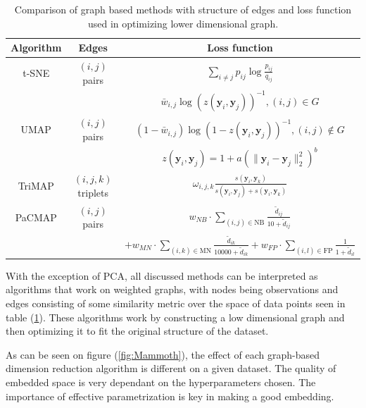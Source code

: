 \begin{table}[htb]
	\begin{center}
		\begin{tabular}{|c|c|c|}
			\hline
			Algorithm & Edges & Loss function \\
			\hline
			t-SNE & $(i, j)$ pairs & $\sum_{i\neq j} p_{ij} \log{\frac{p_{ij}}{q_{ij}}}$ \\
			\hline
			&&
			$\bar{w}_{i,j}\log \left( z(\mathbf{y}_i, \mathbf{y}_j) \right)^{-1}, (i,j) \in G$  \\
			UMAP& $(i, j)$ pairs & $\left(1-\bar{w}_{i,j}\right)\log \left( 1 - z(\mathbf{y}_i, \mathbf{y}_j) \right)^{-1}, (i,j) \notin G$ \\
			&& $z(\mathbf{y}_i, \mathbf{y}_j) = 1+a\left(\|\mathbf{y}_i-\mathbf{y}_j\|_2^{2}\right)^b $ \\
			\hline
			TriMAP & $(i, j, k)$ triplets &
			$\omega_{i,j,k}\frac{s(\mathbf{y}_i,\mathbf{y}_k)}{s(\mathbf{y}_i,\mathbf{y}_j)+s(\mathbf{y}_i,\mathbf{y}_k)}$ \\
			\hline
			PaCMAP & $(i, j)$ pairs &
			$w_{NB}\cdot\sum_{(i,j) \in \textrm{NB}}\frac{\tilde{d}_{ij}}{10 + \tilde{d}_{ij}}$ \\
			&& $+ w_{MN}\cdot\sum_{(i,k) \in \text{MN}}\frac{\tilde{d}_{ik}}{10000 + \tilde{d}_{ik}}+ w_{FP}\cdot\sum_{(i,l) \in \text{FP}}\frac{1}{1 + \tilde{d}_{il}}$ \\
			\hline
		\end{tabular}
		\caption{Comparison of graph based methods with structure of edges and loss function used in optimizing lower dimensional graph.}
		\label{tab:graph}
	\end{center}
\end{table}

With the exception of PCA, all discussed methods can be interpreted as algorithms that work on weighted graphs, with nodes being observations and edges consisting of some similarity metric over the space of data points seen in table (\ref{tab:graph}). These algorithms work by constructing a low dimensional graph and then optimizing it to fit the original structure of the dataset.

As can be seen on figure (\ref{fig:Mammoth}), the effect of each graph-based dimension reduction algorithm is different on a given dataset. The quality of embedded space is very dependant on the hyperparameters chosen. The importance of effective parametrization is key in making a good embedding.

